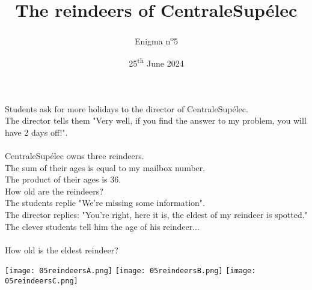 \documentclass[a4paper, top=10mm]{article}
\title{\textbf{\huge{The reindeers of CentraleSupélec}}}
\author{Enigma n\textsuperscript{o}5}
\date{25\textsuperscript{th} June 2024}
\begin{document}
	\maketitle
	
	\Large
	Students ask for more holidays to the director of CentraleSupélec.\\
	The director tells them "Very well, if you find the answer to my problem, you will have 2 days off!".\\
	\\
	CentraleSupélec owns three reindeers.\\
	The sum of their ages is equal to my mailbox number.\\
	The product of their ages is 36.\\
	How old are the reindeers?\\
	The students replie "We're missing some information".\\
	The director replies: "You’re right, here it is, the eldest of my reindeer is spotted."\\
	The clever students tell him the age of his reindeer...\\
	\\
	How old is the eldest reindeer?
	
	\vspace{1cm}
	
	\begin{center}
		\texttt{[image: 05reindeersA.png]}		\texttt{[image: 05reindeersB.png]}		\texttt{[image: 05reindeersC.png]}
	\end{center}
	
	
\end{document}
